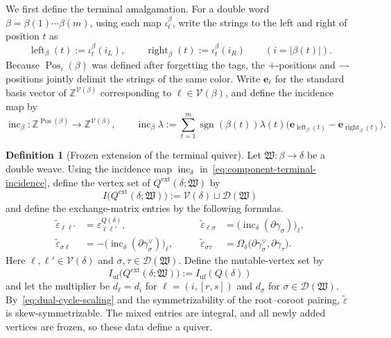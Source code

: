 \documentclass[10pt,a4paper]{article}
\theoremstyle{definition}
\newtheorem{definition}[theorem]{Definition}
\theoremstyle{remark}
\newcommand{\Dcal}{\mathcal D}
\newcommand{\Vcal}{\mathcal V}
\newcommand{\eps}{\varepsilon}
\newcommand{\fW}{\mathfrak W}
\begin{document}
We first define the terminal amalgamation.
For a double word \(\beta=\beta(1)\cdots\beta(m)\), using each map \(\iota_t^\beta\),
write the strings to the left and right of position \(t\) as
\[
 \operatorname{left}_\beta(t)
 :=\iota_t^\beta(i_L),
 \qquad
 \operatorname{right}_\beta(t)
 :=\iota_t^\beta(i_R)
 \qquad(i=|\beta(t)|).
\]
Because \(\operatorname{Pos}_i(\beta)\) was defined after forgetting the tags,
the \(+\)-positions and \(-\)-positions jointly delimit the strings of the same
color.  Write \(\mathbf e_\ell\) for the standard basis vector of
\(\mathbb Z^{\Vcal(\beta)}\) corresponding to \(\ell\in\Vcal(\beta)\), and
define the incidence map by
\begin{equation}
 \operatorname{inc}_\beta:
 \mathbb Z^{\operatorname{Pos}(\beta)}
 \longrightarrow\mathbb Z^{\Vcal(\beta)},
 \qquad
 \operatorname{inc}_\beta\lambda
 :=\sum_{t=1}^m
 \operatorname{sgn}(\beta(t))\lambda(t)
 \bigl(\mathbf e_{\operatorname{left}_\beta(t)}
       -\mathbf e_{\operatorname{right}_\beta(t)}\bigr).
 \label{eq:component-terminal-incidence}
\end{equation}

\begin{definition}[Frozen extension of the terminal quiver]
\label{def:extended}
Let \(\fW:\beta\to\delta\) be a double weave.  Using the incidence map
\(\operatorname{inc}_\delta\) in~\eqref{eq:component-terminal-incidence},
define the vertex set of \(Q^{\mathrm{ext}}(\delta;\fW)\) by
\[
 I\bigl(Q^{\mathrm{ext}}(\delta;\fW)\bigr)
 :=\Vcal(\delta)\sqcup\Dcal(\fW)
\]
and define the exchange-matrix entries by the following formulas.
\begin{equation}
\begin{aligned}
 \widetilde\eps_{\ell\ell'}
 &=\eps^{Q(\delta)}_{\ell\ell'},
 &\qquad
 \widetilde\eps_{\ell\sigma}
 &=\bigl(\operatorname{inc}_\delta(\partial\gamma_\sigma)\bigr)_\ell,\\
 \widetilde\eps_{\sigma\ell}
 &=-\bigl(\operatorname{inc}_\delta
   (\partial\gamma_\sigma^\vee)\bigr)_\ell,
 &\qquad
 \widetilde\eps_{\sigma\tau}
 &=\Omega_\delta
   \bigl(\partial\gamma_\sigma^\vee,\partial\gamma_\tau\bigr).
\end{aligned}
\label{eq:ext-exchange-matrix}
\end{equation}
Here \(\ell,\ell'\in\Vcal(\delta)\) and
\(\sigma,\tau\in\Dcal(\fW)\).  Define the mutable-vertex set by
\[
 I_{\mathrm{uf}}\bigl(Q^{\mathrm{ext}}(\delta;\fW)\bigr)
 :=I_{\mathrm{uf}}(Q(\delta))
\]
and let the multiplier be \(d_\ell=d_i\) for \(\ell=(i,[r,s])\) and
\(d_\sigma\) for \(\sigma\in\Dcal(\fW)\).  By~\eqref{eq:dual-cycle-scaling}
and the symmetrizability of the root--coroot pairing,
\(\widetilde\eps\) is skew-symmetrizable.  The mixed entries are integral, and
all newly added vertices are frozen, so these data define a quiver.
\end{definition}
\end{document}
